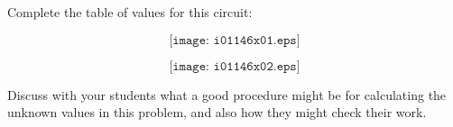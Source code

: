 

Complete the table of values for this circuit:

$$\texttt{[image: i01146x01.eps]}$$







$$\texttt{[image: i01146x02.eps]}$$







Discuss with your students what a good procedure might be for calculating the unknown values in this problem, and also how they might check their work.




